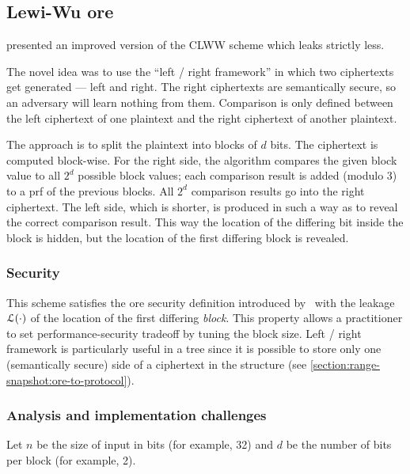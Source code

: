 \subsection{Lewi-Wu \texorpdfstring{\acrshort{ore}}{ORE} \texorpdfstring{\cite{lewi-wu-ore}}{}}

	\textcite{lewi-wu-ore} presented an improved version of the CLWW scheme \cite{clww-ore} which leaks strictly less.

	The novel idea was to use the ``left / right framework'' in which two ciphertexts get generated --- left and right.
	The right ciphertexts are semantically secure, so an adversary will learn nothing from them.
	Comparison is only defined between the left ciphertext of one plaintext and the right ciphertext of another plaintext.

	The approach is to split the plaintext into blocks of $d$ bits.
	The ciphertext is computed block-wise.
	For the right side, the algorithm compares the given block value to all $2^d$ possible block values; each comparison result is added (modulo 3) to a \acrshort{prf} of the previous blocks.
	All $2^d$ comparison results go into the right ciphertext.
	The left side, which is shorter, is produced in such a way as to reveal the correct comparison result.
	This way the location of the differing bit inside the block is hidden, but the location of the first differing block is revealed.

	\subsubsection{Security}

		This scheme satisfies the \acrshort{ore} security definition introduced by~\textcite{clww-ore} with the leakage $\mathcal{L}(\cdot)$ of the location of the first differing \emph{block}.
		This property allows a practitioner to set performance-security tradeoff by tuning the block size.
		Left / right framework is particularly useful in a {\BPlus} tree since it is possible to store only one (semantically secure) side of a ciphertext in the structure (see \cref{section:range-snapshot:ore-to-protocol}).

	\subsubsection{Analysis and implementation challenges}

		Let $n$ be the size of input in bits (for example, 32) and $d$ be the number of bits per block (for example, 2).

